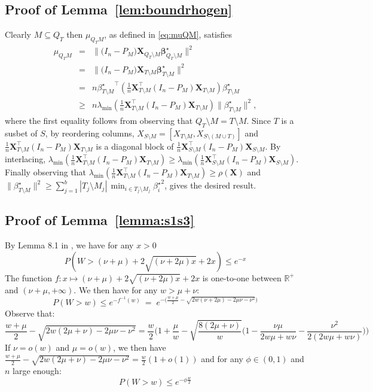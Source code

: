 \documentclass[aos]{imsart}
\theoremstyle{plain}
\newcommand{\R}{\mathbb{R}}
\newcommand{\bs}{\boldsymbol}
\begin{document}
\subsection{Proof of Lemma~\ref{lem:boundrhogen}} 
Clearly $M \subseteq Q_T$ then $\mu_{Q_TM}$, as defined in \eqref{eq:muQM}, satisfies
\begin{eqnarray*}
    \mu_{Q_TM}&=&\|\big(I_n-P_M\big) \bs X_{Q_T\setminus M} \bs \beta^{\star}_{Q_T\setminus M}\|^2\\
    &=&\|\big(I_n-P_M\big) \bs X_{T\setminus M} \bs \beta^{\star}_{T\setminus M}\|^2\\
    &= & n {\beta^{\star}_{T\setminus M}}^\top \left(\tfrac1n \bs X_{T\setminus M}^\top(I_n-P_M)\bs X_{T\setminus M}\right)\beta^{\star}_{T\setminus M}\\
    &\geq & n\lambda_{\min}\left(\tfrac1n \bs X_{T\setminus M}^\top(I_n-P_M)\bs X_{T\setminus M}\right)\|\beta^{\star}_{T\setminus M}\|^2,
\end{eqnarray*}
where the first equality follows from observing that $Q_T\setminus M=T\setminus M$. Since $T$ is a susbet of $S$, by reordering columns, $X_{S\setminus M}=[X_{T\setminus M},X_{S\setminus (M\cup T)}]$ and $\tfrac1n \bs X_{T\setminus M}^\top(I_n-P_M)\bs X_{T\setminus M}$ is a diagonal block of $\tfrac1n \bs X_{S\setminus M}^\top(I_n-P_M)\bs X_{S\setminus M}$. By interlacing, $\lambda_{\min}\left(\tfrac1n \bs X_{T\setminus M}^\top(I_n-P_M)\bs X_{T\setminus M}\right) \geq \lambda_{\min}\left(\tfrac1n \bs X_{S\setminus M}^\top(I_n-P_M)\bs X_{S\setminus M}\right)$. Finally observing that 
$\lambda_{\min}\left(\tfrac1n \bs X_{T\setminus M}^\top(I_n-P_M)\bs X_{T\setminus M}\right) \geq \rho(\bs X)$ and $\|\beta^{\star}_{T\setminus M}\|^2\geq \sum_{j=1}^b|T_j\setminus M_j|\,\min_{i\in T_j\setminus M_j}{\beta_{i}^{\star}}^2$, gives the desired result.

\subsection{Proof of Lemma~\ref{lemma:s1s3}}
By Lemma 8.1 in \cite{birge}, we have for any $x>0$
$$P(W> (\nu+\mu)+2 \sqrt{(\nu+2 \mu) x}+2 x) \leq e^{-x}$$
The function $f:x\mapsto (\nu+\mu)+2 \sqrt{(\nu+2 \mu) x}+2 x$ is  one-to-one between $\R^+$ and $( \nu+
\mu,+\infty)$. We then have  for any $w>\mu+\nu$:
$$P(W > w) \leq e^{-f^{-1}(w)} \:=\; e^{-\big(\frac{w+\mu}{2}  - \sqrt{2w(\nu+2 \mu)-2 \mu \nu - \nu^2 }\big) } $$
Observe that:
$$\frac{w+\mu}{2}  - \sqrt{2w( 2 \mu+ \nu)-2 \mu \nu - \nu^2 }= \frac{w}{2}\bigg(1+\frac{\mu}{w} -\sqrt{\frac{8(2 \mu+\nu)}{w}}\bigg(1-\frac{\nu\mu}{2w\mu+w\nu}-\frac{\nu^2}{2(2w\mu+w\nu)} \bigg)\bigg)$$
 If $\nu=o(w)$ and $\mu=o(w)$, we then have $\frac{w+\mu}{2}  - \sqrt{2w( 2 \mu+ \nu)-2 \mu \nu - \nu^2 }= \frac{w}{2}(1+o(1))$ and for any $\phi\in(0,1)$ and $n$ large enough:
$$P(W > w) \leq  e^{-\phi\frac{w}{2}}$$
\end{document}
